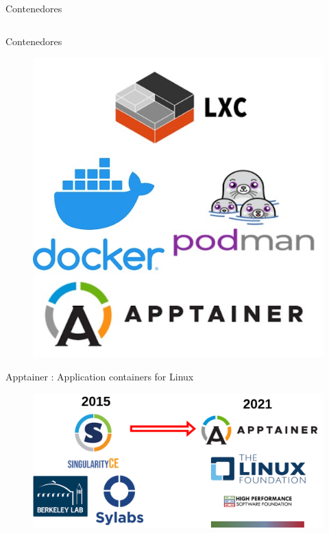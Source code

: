\documentclass[11pt]{beamer}
\begin{document}
\begin{frame}{Contenedores}
\begin{columns}
\begin{column}{0.5\textwidth}
\end{column}
\end{columns}
\end{frame}

\begin{frame}{Contenedores}
  \begin{figure}
  	\includegraphics[scale=0.35]{images/contenedores_tecnologias}
  \end{figure}
\end{frame}


\begin{frame}{Apptainer : Application containers for Linux}
  \begin{figure}
  	\includegraphics[scale=0.31]{images/apptainer_historia}
  \end{figure}
\end{frame}
\end{document}
